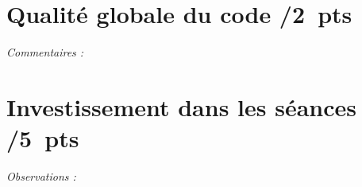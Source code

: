 \documentclass[QCM, noCustomPackages]{UPSTI_Document}
\begin{document}
{{    \section*{Qualité globale du code
              \hfill \normalfont\small /2~pts}


    \smallskip
    \noindent\textit{Commentaires :}\\[2pt]

    \bigskip

    \section*{Investissement dans les séances
              \hfill \normalfont\small /5~pts}


    \smallskip
    \noindent\textit{Observations :}\\[2pt]

    \AMCcleardoublepage
  }%
}
\end{document}
